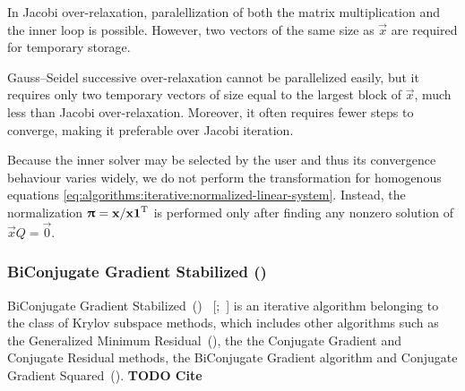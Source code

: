 In Jacobi over-relaxation, paralellization of both the matrix
multiplication and the inner loop is possible. However, two vectors of
the same size as $\vec{x}$ are required for temporary storage.

Gauss--Seidel successive over-relaxation cannot be parallelized easily,
but it requires only two temporary vectors of size equal to the largest
block of $\vec{x}$, much less than Jacobi over-relaxation. Moreover, it
often requires fewer steps to converge, making it preferable over
Jacobi iteration.

Because the inner solver may be selected by the user and thus its
convergence behaviour varies widely, we do not perform the
transformation for homogenous equations
\eqref{eq:algorithms:iterative:normalized-linear-system}. Instead, the
normalization $\bm{\mathrm{\uppi}} = \bm{\mathrm{x}} / \bm{\mathrm{x}}\bm{\mathrm{1}}^{\mathrm{T}}$ is performed
only after finding any nonzero solution of $\vec{x} Q = \vec{0}$.

\subsubsection{BiConjugate Gradient Stabilized ()}

BiConjugate Gradient Stabilized~()%
~\mkbibbrackets{;~}
is an iterative algorithm belonging to the class of Krylov subspace
methods, which includes other algorithms such as the Generalized
Minimum Residual~(), the the Conjugate Gradient and
Conjugate Residual methods, the BiConjugate Gradient algorithm and
Conjugate Gradient Squared~(). \textbf{TODO Cite}

